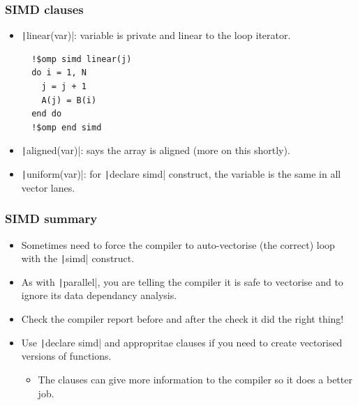 \documentclass{beamer}
\begin{document}
\begin{frame}[fragile]
\frametitle{SIMD clauses}
\begin{itemize}
  \item \texttt|linear(var)|: variable is private and linear to the loop iterator.
  \begin{verbatim}
  !$omp simd linear(j)
  do i = 1, N
    j = j + 1
    A(j) = B(i)
  end do
  !$omp end simd
  \end{verbatim}
  \item \texttt|aligned(var)|: says the array is aligned (more on this shortly).
  \item \texttt|uniform(var)|: for \texttt|declare simd| construct, the variable is the same in all vector lanes.
\end{itemize}
\end{frame}

\begin{frame}
\frametitle{SIMD summary}

\begin{itemize}
  \item Sometimes need to force the compiler to auto-vectorise (the correct) loop with the \texttt|simd| construct.
  \item As with \texttt|parallel|, you are telling the compiler it is safe to vectorise and to ignore its data dependancy analysis.
  \item Check the compiler report before and after the check it did the right thing!
  \item Use \texttt|declare simd| and appropritae clauses if you need to create vectorised versions of functions.
  \begin{itemize}
    \item The clauses can give more information to the compiler so it does a better job.
  \end{itemize}
\end{itemize}

\end{frame}

\end{document}
